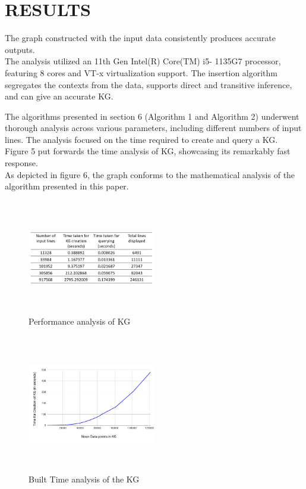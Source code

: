 \documentclass[conference]{IEEEtran}
\begin{document}
\section{RESULTS}
The graph constructed with the input data consistently produces accurate outputs.\\
The analysis utilized an 11th Gen Intel(R) Core(TM) i5-
1135G7 processor, featuring 8 cores and VT-x virtualization
support.
The insertion algorithm segregates the contexts from the data, supports direct and transitive inference, and can give an accurate KG.

The algorithms presented in section 6 (Algorithm 1 and Algorithm 2) underwent thorough analysis across various parameters, including different numbers of input lines. The analysis focused on the time required to create and query a KG.\\

Figure 5 put forwards the time analysis of KG, showcasing its remarkably fast response.
\\
As depicted in figure 6, the graph conforms to the mathematical analysis of the algorithm presented in this paper.


\begin{figure}[htbp]
\centerline{\includegraphics[width=0.5\textwidth , height=5cm]{result_4.png}}
\caption{Performance analysis of KG}
\label{fig}
\end{figure}


\begin{figure}[htbp]
\centerline{\includegraphics[width=0.5\textwidth , height=6cm]{chart_final.png}}
\caption{Built Time analysis of the KG}
\label{fig}
\end{figure}
\end{document}
